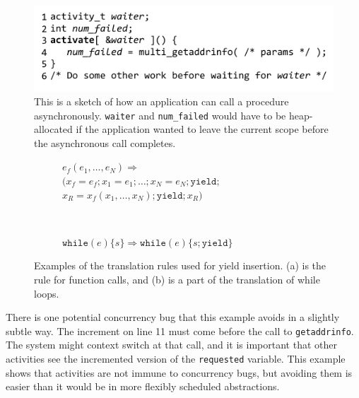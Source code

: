 \documentclass[9pt,preprint]{sigplanconf}
\begin{document}
\begin{figure}
\includegraphics{multi_getaddrinfo_async_call}
\caption{This is a sketch of how an application can call a procedure asynchronously.
\texttt{waiter} and \texttt{num\_failed} would have to be heap-allocated if the application wanted to leave the current scope before the asynchronous call completes.}
\label{fig:charcoal_multidns_async_call}
\end{figure}

\begin{figure}
    \centering
    \begin{subfigure}[b]{0.5\textwidth}
  $e_f(e_1, \ldots, e_N) \Rightarrow$ \\
  \hspace*{1em} $( x_f=e_f; x_1=e_1; \ldots; x_N=e_N; \mathtt{yield};$ \\
  \hspace*{2em} $x_R=x_f(x_1, \ldots, x_N); \mathtt{yield}; x_R )$
        \caption{}
    \end{subfigure}
    ~ %
    \begin{subfigure}[b]{0.5\textwidth}
  $\mathtt{while}( e ) \{ s \} \Rightarrow \mathtt{while}( e ) \{ s; \mathtt{yield} \}$
        \caption{}
    \end{subfigure}
    \caption{Examples of the translation rules used for yield insertion.
      (a) is the rule for function calls, and (b) is a part of the translation of while loops.}
    \label{fig:translation}
\end{figure}

There is one potential concurrency bug that this example avoids in a slightly subtle way.
The increment on line 11 must come before the call to \texttt{getaddrinfo}.
The system might context switch at that call, and it is important that other activities see the incremented version of the \texttt{requested} variable.
This example shows that activities are not immune to concurrency bugs, but avoiding them is easier than it would be in more flexibly scheduled abstractions.
\end{document}
